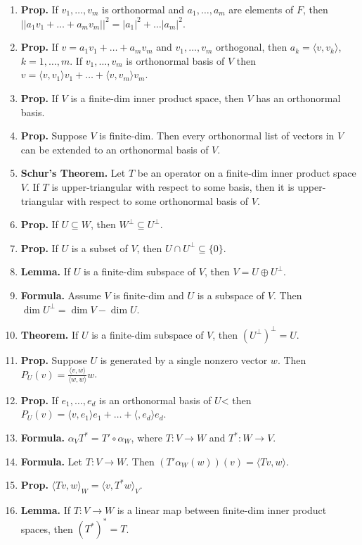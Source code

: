\begin{enumerate}
	\item \textbf{Prop. } If $v_1,\dots,v_m$ is orthonormal and $a_1,\dots,a_m$ are elements of $F$, then $||a_1v_1 + \dots + a_mv_m||^2 = |a_1|^2 + \dots |a_m|^2$. 
	\item \textbf{Prop. } If $v=a_1v_1 + \dots + a_mv_m$ and $v_1,\dots,v_m$ orthogonal, then $a_k = \langle v,v_k \rangle$, $k=1,\dots,m$. If $v_1,\dots,v_m$ is orthonormal basis of $V$ then $v=\langle v,v_1 \rangle v_1 + \dots + \langle v,v_m \rangle v_m$. 
	\item \textbf{Prop. } If $V$ is a finite-dim inner product space, then $V$ has an orthonormal basis. 
	\item \textbf{Prop. } Suppose $V$ is finite-dim. Then every orthonormal list of vectors in $V$ can be extended to an orthonormal basis of $V$. 
	\item \textbf{Schur's Theorem. } Let $T$ be an operator on a finite-dim inner product space $V$. If $T$ is upper-triangular with respect to some basis, then it is upper-triangular with respect to some orthonormal basis of $V$. 
	\item \textbf{Prop. } If $U \subseteq W$, then $W^\perp \subseteq U^\perp$. 
	\item \textbf{Prop. } If $U$ is a subset of $V$, then $U \cap U^\perp \subseteq \{0\}$. 
	\item \textbf{Lemma. } If $U$ is a finite-dim subspace of $V$, then $V=U \oplus U^\perp$. 
	\item \textbf{Formula. } Assume $V$ is finite-dim and $U$ is a subspace of $V$. Then $\dim U^\perp = \dim V - \dim U$. 
	\item \textbf{Theorem. } If $U$ is a finite-dim subspace of $V$, then $(U^\perp)^\perp = U$. 
	\item \textbf{Prop. } Suppose $U$ is generated by a single nonzero vector $w$. Then $P_U(v) = \frac{\langle v,w \rangle}{\langle w,w \rangle}w$. 
	\item \textbf{Prop. } If $e_1,\dots,e_d$ is an orthonormal basis of $U$< then $P_U(v) = \langle v,e_1 \rangle e_1 + \dots + \langle ,e_d \rangle e_d$. 
	\item \textbf{Formula. } $\alpha_V T^* = T' \circ \alpha_W$, where $T: V \to W$ and $T^*: W \to V$. 
	\item \textbf{Formula. } Let $T: V \to W$. Then $(T'\alpha_W(w))(v) = \langle Tv,w \rangle$. 
	\item \textbf{Prop. } $\langle Tv,w \rangle_W = \langle v,T^*w \rangle_V$. 
	\item \textbf{Lemma. } If $T: V \to W$ is a linear map between finite-dim inner product spaces, then $(T^*)^* = T$. 

\end{enumerate}
